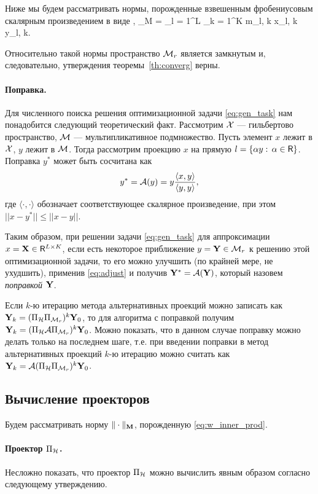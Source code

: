 \documentclass[12pt,a4paper,fleqn,leqno]{article}
\begin{document}
Ниже мы будем рассматривать нормы, порожденные взвешенным фробениусовым скалярным произведением в виде
\be
\label{eq:w_inner_prod}
\langle\bfX, \bfY\rangle_M = \sum_{l = 1}^L \sum_{k = 1}^K m_{l, k} x_{l, k} y_{l, k}.
\ee

Относительно такой нормы пространство $\mathcal{M}_r$ является замкнутым и, следовательно, утверждения теоремы~\ref{th:converg} верны.

\paragraph{Поправка.} Для численного поиска решения оптимизационной задачи \eqref{eq:gen_task} нам понадобится следующий теоретический факт.
Рассмотрим $\mathcal{X}$ --- гильбертово пространство, $\mathcal{M}$ --- мультипликативное подмножество. Пусть элемент $x$ лежит в $\mathcal{X}$, $y$ лежит в $\mathcal{M}$. Тогда рассмотрим проекцию $x$ на прямую $l = \{\alpha y:\, \alpha \in \mathsf{R}\}$. Поправка $y^*$ может быть сосчитана как
\begin{equation}
\label{eq:adjust}
y^* = \mathcal{A}(y)= y \frac{\langle x, y\rangle}{\langle y, y\rangle},
\end{equation}
где $\langle\cdot, \cdot\rangle$ обозначает соответствующее скалярное произведение, при этом $||x - y^*|| \le ||x - y||$. 

Таким образом, при решении задачи \eqref{eq:gen_task} для аппроксимации $x=\mathbf{X} \in \mathsf{R}^{L \times K}$, если есть некоторое приближение $y=\mathbf{Y} \in \mathcal{M}_r$ к решению этой оптимизационной задачи, то его можно улучшить (по крайней мере, не ухудшить), применив \eqref{eq:adjust} и получив $\mathbf{Y}^*=\mathcal{A}(\mathbf{Y})$, который назовем \emph{поправкой $\mathbf{Y}$}.

Если $k$-ю итерацию метода альтернативных проекций можно записать как
$\mathbf{Y}_{k}=(\Pi_{\mathcal{H}} \Pi_{\mathcal{M}_r})^k \mathbf{Y}_{0}$, то для алгоритма с поправкой получим
$\mathbf{Y}_{k}=(\Pi_{\mathcal{H}} \mathcal{A} \Pi_{\mathcal{M}_r})^k \mathbf{Y}_{0}$.
Можно показать, что в данном случае поправку можно делать только на последнем шаге,
т.е. при введении поправки в метод альтернативных проекций $k$-ю итерацию можно считать как $\mathbf{Y}_{k}=\mathcal{A} (\Pi_{\mathcal{H}} \Pi_{\mathcal{M}_r})^k \mathbf{Y}_{0}$.

\subsection{Вычисление проекторов}

Будем рассматривать норму $\|\cdot\|_{\mathbf{M}}$, порожденную \eqref{eq:w_inner_prod}.

\paragraph{Проектор $\Pi_{\mathcal{H}}$.} Несложно показать, что проектор $\Pi_{\mathcal{H}}$
можно вычислить явным образом согласно следующему утверждению.
\end{document}
